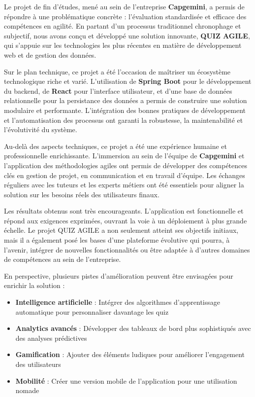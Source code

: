 \documentclass[12pt,a4paper]{report}
\begin{document}
Le projet de fin d'études, mené au sein de l'entreprise \textbf{Capgemini}, a permis de répondre à une problématique concrète : l'évaluation standardisée et efficace des compétences en agilité. En partant d'un processus traditionnel chronophage et subjectif, nous avons conçu et développé une solution innovante, \textbf{QUIZ AGILE}, qui s'appuie sur les technologies les plus récentes en matière de développement web et de gestion des données.

\medskip
\noindent
Sur le plan technique, ce projet a été l'occasion de maîtriser un écosystème technologique riche et varié. L'utilisation de \textbf{Spring Boot} pour le développement du backend, de \textbf{React} pour l'interface utilisateur, et d'une base de données relationnelle pour la persistance des données a permis de construire une solution modulaire et performante. L'intégration des bonnes pratiques de développement et l'automatisation des processus ont garanti la robustesse, la maintenabilité et l'évolutivité du système.

\medskip
\noindent
Au-delà des aspects techniques, ce projet a été une expérience humaine et professionnelle enrichissante. L'immersion au sein de l'équipe de \textbf{Capgemini} et l'application des méthodologies agiles ont permis de développer des compétences clés en gestion de projet, en communication et en travail d'équipe. Les échanges réguliers avec les tuteurs et les experts métiers ont été essentiels pour aligner la solution sur les besoins réels des utilisateurs finaux.

\medskip
\noindent
Les résultats obtenus sont très encourageants. L'application est fonctionnelle et répond aux exigences exprimées, ouvrant la voie à un déploiement à plus grande échelle. Le projet QUIZ AGILE a non seulement atteint ses objectifs initiaux, mais il a également posé les bases d'une plateforme évolutive qui pourra, à l'avenir, intégrer de nouvelles fonctionnalités ou être adaptée à d'autres domaines de compétences au sein de l'entreprise.

\medskip
\noindent
En perspective, plusieurs pistes d'amélioration peuvent être envisagées pour enrichir la solution :
\begin{itemize}
    \item \textbf{Intelligence artificielle} : Intégrer des algorithmes d'apprentissage automatique pour personnaliser davantage les quiz
    \item \textbf{Analytics avancés} : Développer des tableaux de bord plus sophistiqués avec des analyses prédictives
    \item \textbf{Gamification} : Ajouter des éléments ludiques pour améliorer l'engagement des utilisateurs
    \item \textbf{Mobilité} : Créer une version mobile de l'application pour une utilisation nomade
\end{itemize}
\end{document}
